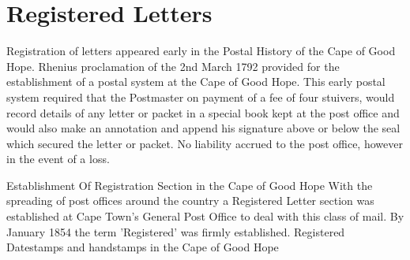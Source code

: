 \chapter{Registered Letters}
 

	 
 

Registration of letters appeared early in the Postal History of the 
Cape of Good Hope. Rhenius proclamation of the 2nd March 1792 provided 
for the establishment of a postal system at the Cape of Good Hope. 
This early postal system required that the Postmaster on payment of a 
fee of four stuivers, would record details of any letter or packet 
in a special book kept at the post office and would also make an 
annotation and append his signature above or below the seal which 
secured the letter or packet. No liability accrued to the post office, 
however in the event of a loss.



Establishment Of Registration Section in the Cape of Good Hope
With the spreading of post offices around the country a Registered 
Letter section was established at Cape Town's General Post Office 
to deal with this class of mail. By January 1854 the term 'Registered' 
was firmly established.
Registered Datestamps and handstamps in the Cape of Good Hope

